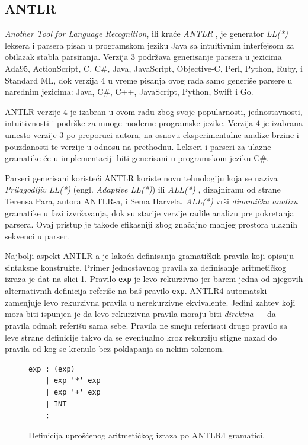 \subsection{ANTLR}
\label{subsec:ANTLR}
\emph{Another Tool for Language Recognition}, ili kraće \emph{ANTLR} \cite{ANTLR}, je generator \emph{LL(*)} \cite{LLStar} leksera i parsera pisan u programskom jeziku Java sa intuitivnim interfejsom za obilazak stabla parsiranja. Verzija $3$ podržava generisanje parsera u jezicima Ada95, ActionScript, C, C\#, Java, JavaScript, Objective-C, Perl, Python, Ruby, i Standard ML, dok verzija $4$ u vreme pisanja ovog rada samo generiše parsere u narednim jezicima: Java, C\#, C++, JavaScript, Python, Swift i Go.

ANTLR verzije $4$ je izabran u ovom radu zbog svoje popularnosti, jednostavnosti, intuitivnosti i podrške za mnoge moderne programske jezike. Verzija $4$ je izabrana umesto verzije $3$ po preporuci autora, na osnovu eksperimentalne analize brzine i pouzdanosti te verzije u odnosu na prethodnu. Lekseri i parseri za ulazne gramatike će u implementaciji biti generisani u programskom jeziku C\#.

Parseri generisani koristeći ANTLR koriste novu tehnologiju koja se naziva \emph{Prilagodljiv LL(*)} (engl. \emph{Adaptive LL(*)}) ili \emph{ALL(*)} \cite{ANTLRReference}, dizajniranu od strane Terensa Para, autora ANTLR-a, i Sema Harvela. \emph{ALL(*)} vrši \emph{dinamičku analizu} gramatike u fazi izvršavanja, dok su starije verzije radile analizu pre pokretanja parsera. Ovaj pristup je takođe efikasniji zbog značajno manjeg prostora ulaznih sekvenci u parser.

Najbolji aspekt ANTLR-a je lakoća definisanja gramatičkih pravila koji opisuju sintaksne konstrukte. Primer jednostavnog pravila za definisanje aritmetičkog izraza je dat na slici \ref{fig:ANTLRExpressions}. Pravilo \texttt{exp} je levo rekurzivno jer barem jedna od njegovih alternativnih definicija referiše na baš pravilo \texttt{exp}. ANTLR4 automatski zamenjuje levo rekurzivna pravila u nerekurzivne ekvivalente. Jedini zahtev koji mora biti ispunjen je da levo rekurzivna pravila moraju biti \emph{direktna} --- da pravila odmah referišu sama sebe. Pravila ne smeju referisati drugo pravilo sa leve strane definicije takvo da se eventualno kroz rekurziju stigne nazad do pravila od kog se krenulo bez poklapanja sa nekim tokenom.

\begin{figure}[h!]
\begin{lstlisting}[language={}]
exp : (exp)
    | exp '*' exp
    | exp '+' exp
    | INT
    ;
\end{lstlisting}
\caption{Definicija uprošćenog aritmetičkog izraza po ANTLR4 gramatici.}
\label{fig:ANTLRExpressions}
\end{figure}


